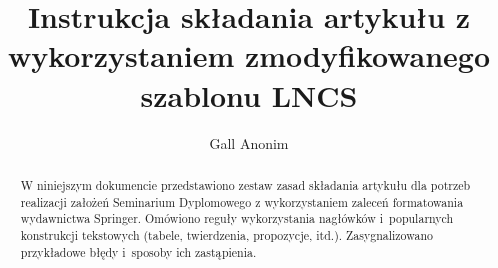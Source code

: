 

\title{Instrukcja składania artykułu z wykorzystaniem zmodyfikowanego szablonu LNCS}
\author{Gall Anonim}



\maketitle

\begin{abstract}
	W niniejszym dokumencie przedstawiono zestaw zasad składania artykułu dla potrzeb realizacji założeń Seminarium Dyplomowego z wykorzystaniem zaleceń formatowania wydawnictwa Springer. Omówiono reguły wykorzystania nagłówków i~popularnych konstrukcji tekstowych (tabele, twierdzenia, propozycje, itd.). Zasygnalizowano przykładowe błędy i~sposoby ich zastąpienia.

\end{abstract}





\begin{thebibliography}{}

\end{thebibliography}


